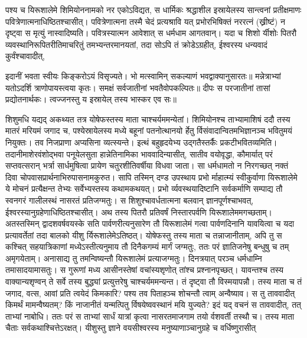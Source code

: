 \vakya पश्य च यिरूशालेमे शिमियोननामको नर एकोऽविद्यत, स धार्मिकः श्रद्धाशील इस्रायेलस्य सान्त्वनां प्रतीक्षमाणः पवित्रेणात्मनाधिष्ठितश्चासीत्।
\vakya पवित्रेणात्मना तस्मै चेदं प्रत्यश्रावि यत् प्रभोरभिषिक्तं नररत्नं (ख्रीष्टं) न दृष्ट्वा स मृत्युं नास्वादिष्यति।
\vakya पवित्रस्यात्मन आवेशात् स धर्मधाम आगतवान्। यदा च शिशो र्यीशोः पितरौ व्यवस्थानिरूपितरीतिमाचरितुं तमभ्यन्तरमानयतां,
\vakya तदा सोऽपि तं क्रोडेऽग्रहीत्, ईश्वरस्य धन्यवादं कुर्वंश्चावादीत्,
\begin{poem}
\startwithvakya इदानीं भवता स्वीयः किङ्करोऽयं विसृज्यते।
\pline भो मत्स्वामिन् सकल्याणं भवद्वाक्यानुसारतः॥
\vakya मन्नेत्राभ्यां यतोऽदर्शि त्राणोपायस्त्वया कृतः।
\pline समक्षं सर्वजातीनां भवतैवोपकल्पितः॥
\vakya दीपः स परजातीनां तासां प्रद्योतनार्थकः।
\vakya त्वज्जनस्तु य इस्रायेल् तस्य भास्कर एव सः॥
\end{poem}
\vakya शिशुमधि यद्यद् अकथ्यत तत्र योषेफस्तस्य माता चाश्चर्यममन्येतां।
\vakya शिमियोनश्च ताभ्यामाशिषं ददौ तस्य मातरं मरियमं जगाद च, पश्येस्रायेलस्य मध्ये बहूनां पतनोत्थानयो र्हेतु र्विसंवादान्वितमभिज्ञानञ्च भवितुमयं नियुक्तः।
\vakya तव निजप्राणा अप्यसिना व्यत्स्यन्ते। इत्थं बहुहृदयेभ्य उद्गतैस्तर्कैः प्रकटीभवितव्यमिति।
\vakya तदानीमाशेरवंशोद्भवा पनूयेलसुता हान्नेतिनामिका भाववादिन्यासीत्, सातीव वयोवृद्धा, कौमार्यात् परं सप्तवत्सरान् भर्त्रा सार्धमुषित्वा प्रायेण चतुरशीतिवर्षीया विधवा जाता।
\vakya सा धर्मधामतो न निरगच्छत् नक्तं दिवा चोपवासप्रार्थनाभिरुपासनामकुरुत।
\vakya सापि तस्मिन् दण्ड उपस्थाय प्रभो र्माहात्म्यं स्वीकुर्वाणा यिरूशालेमे ये मोचनं प्रत्यैक्षन्त तेभ्यः सर्वेभ्यस्तस्य कथामकथयत्।
\vakya प्रभो र्व्यवस्थयादिष्टानि सर्वकर्माणि सम्पाद्य तौ स्वनगरं गालीलस्थं नासरतं प्रतिजग्मतुः।
\vakya स शिशुश्चावर्धतात्मना बलवान् ज्ञानपूर्णश्चाभवत्, ईश्वरस्यानुग्रहेणाधिष्ठितश्चासीत्।
\vakya अथ तस्य पितरौ प्रतिवर्षं निस्तारपर्वणि यिरूशालेममगच्छताम्।
\vakya अतस्तस्मिन् द्वादशवर्षवयस्के सति पार्वणरीत्यनुसारेण तौ यिरूशालेमं गत्वा पार्वणदिनानि यावयित्वा च यदा प्रत्यावर्तेतां तदा बालको यीशु र्यिरूशालेमेऽतिष्ठत्।
\vakya योषेफस्तु तस्य माता च तन्नाजानीताम्,
\vakya अपि तु स कश्चित् सहयात्रिकाणां मध्येऽस्तीत्यनुमाय तौ दिनैकगम्यं मार्गं जग्मतुः, ततः परं ज्ञातिजनेषु बन्धुषु च तम् अमृगयेताम्।
\vakya अनासाद्य तु तमन्विष्यन्तौ यिरूशालेमं प्रत्याजग्मतुः।
\vakya दिनत्रयात् परञ्च धर्मधाम्नि तमासादयामासतुः। स गुरूणां मध्य आसीनस्तेषां वचांस्यशृणोत् तांश्च प्रश्नानपृच्छत्।
\vakya यावन्तश्च तस्य वाक्यान्यशृण्वन् ते सर्वे तस्य बुद्ध्यां प्रत्युत्तरेषु चाश्चर्यममन्यन्त।
\vakya तं दृष्ट्वा तौ विस्मयापन्नौ। तस्य माता च तं जगाद, वत्स, आवां प्रति त्वयेदं किमकारि? पश्य तव पिताहञ्च शोचन्तौ त्वाम् अन्वैष्याव।
\vakya स तु ताववादीत् किमर्थं मामन्वैष्यतम्? किं नाजानीतं यन्मत्पितु र्विषयेष्ववस्थानं मयि युज्यते?
\vakya इदं यद् वचनं स ताववादीत्, तत् ताभ्यां नाबोधि।
\vakya ततः परं स ताभ्यां सार्धं यात्रां कृत्वा नासरतमाजगाम तयो र्वशवर्ती तस्थौ च। तस्य माता चैताः सर्वकथाश्चित्तेऽरक्षत्।
\vakya यीशुस्तु ज्ञाने वयसीश्वरस्य मनुष्याणाञ्चानुग्रहे च वर्धिष्णुरासीत्\eoc